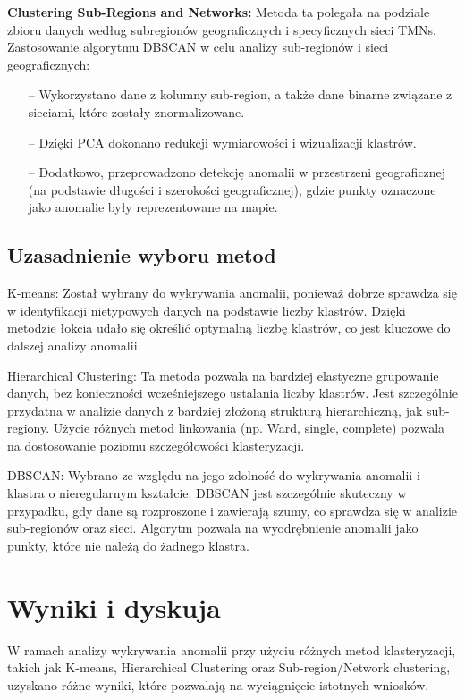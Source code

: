 \documentclass[a4paper,fleqn]{cas-dc}
\begin{document}
\textbf{Clustering Sub-Regions and Networks:} Metoda ta polegała na podziale zbioru danych według subregionów geograficznych i specyficznych sieci TMNs. Zastosowanie algorytmu DBSCAN w celu analizy sub-regionów i sieci geograficznych:
\begin{itemize}
\item[--] Wykorzystano dane z kolumny sub-region, a także dane binarne związane z sieciami, które zostały znormalizowane.
\item[--] Dzięki PCA dokonano redukcji wymiarowości i wizualizacji klastrów.
\item[--] Dodatkowo, przeprowadzono detekcję anomalii w przestrzeni geograficznej (na podstawie długości i szerokości geograficznej), gdzie punkty oznaczone jako anomalie były reprezentowane na mapie.
\end{itemize}

\subsection{Uzasadnienie wyboru metod}
K-means: Został wybrany do wykrywania anomalii, ponieważ dobrze sprawdza się w identyfikacji nietypowych danych na podstawie liczby klastrów. Dzięki metodzie łokcia udało się określić optymalną liczbę klastrów, co jest kluczowe do dalszej analizy anomalii.

Hierarchical Clustering: Ta metoda pozwala na bardziej elastyczne grupowanie danych, bez konieczności wcześniejszego ustalania liczby klastrów. Jest szczególnie przydatna w analizie danych z bardziej złożoną strukturą hierarchiczną, jak sub-regiony. Użycie różnych metod linkowania (np. Ward, single, complete) pozwala na dostosowanie poziomu szczegółowości klasteryzacji.

DBSCAN: Wybrano ze względu na jego zdolność do wykrywania anomalii i klastra o nieregularnym kształcie. DBSCAN jest szczególnie skuteczny w przypadku, gdy dane są rozproszone i zawierają szumy, co sprawdza się w analizie sub-regionów oraz sieci. Algorytm pozwala na wyodrębnienie anomalii jako punkty, które nie należą do żadnego klastra.


\newpage
\section{Wyniki i dyskuja}
W ramach analizy wykrywania anomalii przy użyciu różnych metod klasteryzacji, takich jak K-means, Hierarchical Clustering oraz Sub-region/Network clustering, uzyskano różne wyniki, które pozwalają na wyciągnięcie istotnych wniosków.
\end{document}
